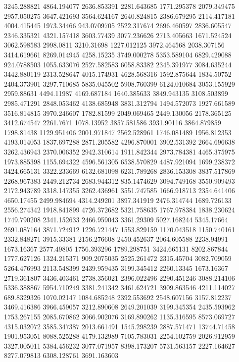 3245.288821
4864.194077
2636.853391
2281.643685
1771.295378
2079.349475
2957.050275
3647.421693
3564.624167
2640.824815
2386.679295
2114.417181
4004.415445
1973.34466
943.0709705
2522.317674
2696.460597
2836.605547
2346.335321
4321.157418
3603.77439
3077.236626
2713.405663
1671.524524
3062.598583
2998.0811
3210.31698
1227.012125
3972.464568
2038.307156
3414.619661
8269.014945
4258.15235
3749.000278
5353.589104
6829.429088
924.0788503
1055.633076
2527.582583
6058.83382
2345.391977
3084.635244
3442.880119
2313.528647
4015.174931
4628.568316
1592.875644
1834.50752
2404.373901
3297.710685
5835.045502
5908.760399
6124.010684
3053.155929
2959.88631
4494.11987
4169.687184
1640.385633
3849.943135
3108.503899
2985.471291
2848.053462
4138.685948
3831.312794
1494.572073
1927.661589
3516.814815
3970.246607
1782.81599
2049.069465
2449.130056
2178.365125
3412.674547
2261.7671
1078.13952
3857.581586
3931.90116
3864.879859
1798.81438
1129.951406
2001.971847
2562.528961
1746.081489
1956.812353
4193.014053
1837.697288
2871.205582
4296.870001
3902.531392
2664.696638
3262.436943
2370.006352
2942.310614
1911.842344
2973.784381
4465.375975
1973.885398
1155.694322
4596.561305
6538.570829
4487.921094
1699.238372
3424.665131
3322.233669
6132.681098
6231.789268
2836.153308
3837.517869
2268.967383
2449.212734
2683.944312
835.1474629
3094.749168
3550.909493
2172.943789
3318.147355
3262.436961
3551.747585
1666.918713
2354.641406
4650.17455
2499.984694
4314.249201
3897.341919
2476.314744
1689.726133
2556.274342
1918.841899
4726.372682
5321.758635
1767.978384
1838.230624
1749.790208
2341.152633
2466.959043
3361.29309
5027.168244
5345.17664
2691.087164
3871.724912
1226.721447
1553.829159
1170.043518
1150.740161
2332.848271
3915.33381
2156.276608
2450.452637
2064.605588
2238.94991
1673.16367
2577.49805
1756.393296
1789.298751
3424.665131
8202.867844
1777.627126
1324.215371
909.2075035
2525.261472
2315.45704
3082.709059
5264.476993
2113.548399
2439.959435
3199.345412
2260.13345
1673.16367
2719.361807
3436.403461
2738.356021
2396.022496
2290.451246
3088.214106
5336.388867
5954.710249
3381.241342
3461.624721
3909.863546
4211.114027
689.8329326
1070.02147
1084.685248
2392.553692
2548.607156
3157.812237
3469.416386
3966.459057
3212.890608
2649.201039
3199.345354
2435.593962
1753.267155
2085.670862
3066.902076
3169.890262
1135.316595
8573.069727
4315.032072
3585.347387
2013.661491
1545.298239
2887.571471
13744.71458
1901.953051
8088.525288
4179.132989
7105.783031
2254.102759
2026.912959
3327.005011
5384.456232
3077.071957
8398.173207
5731.563157
2227.164627
8277.079813
6308.128761
3691.163603
